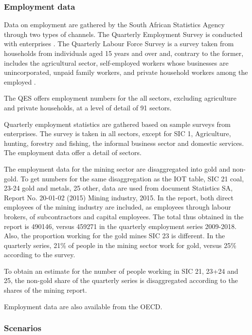 \documentclass[12pt,english]{article}
\newcommand\lies[2][]{\todo[color=orange!50,#1]{ldf: #2}}
\begin{document}
\subsubsection{Employment data}
Data on employment are gathered by the South African Statistics Agency through two types of channels. The Quarterly Employment Survey is conducted with enterprises \citep{QES2018}. The Quarterly Labour Force Survey is a survey taken from households from individuals aged 15 years and over and, contrary to the former, includes the agricultural sector, self-employed workers whose businesses are unincorporated, unpaid family workers, and private household workers among the employed \citep{QLFS2018}.

The QES offers employment numbers for the all sectors, excluding agriculture and private households, at a level of detail of 91 sectors. 


Quarterly employment statistics are gathered based on sample surveys from enterprises. The survey is taken in all sectors, except for SIC 1, Agriculture, hunting, forestry and fishing, the informal business sector and domestic services. The employment data offer a detail of sectors.

The employment data for the mining sector are disaggregated into gold and non-gold. To get numbers for the same disaggregation as the IOT table, SIC 21 coal, 23-24 gold and metals, 25 other, data are used from document Statistics SA, Report No. 20-01-02 (2015) Mining industry, 2015. In the report, both direct employees of the mining industry are included, as employees through labour brokers, of subcontractors and capital employees\lies{what are those?}. The total thus obtained in the report is 490146, versus 459271 in the quarterly employment series 2009-2018. Also, the proportion working for the gold mines SIC 23 is different. In the quarterly series, 21\% of people in the mining sector work for gold, versus 25\% according to the survey.

To obtain an estimate for the number of people working in SIC 21, 23+24 and 25, the non-gold share of the quarterly series is disaggregated according to the shares of the mining report. 


Employment data are also available from the OECD. 

\subsubsection{Scenarios}
\end{document}
